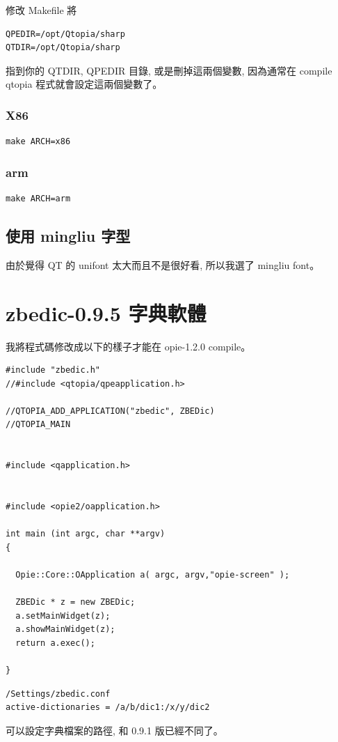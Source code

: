 \documentclass[12pt,a4paper]{article}
\begin{document}
\begin{CJK}{UTF8}{cwmu}
修改 Makefile 將
\begin{verbatim}
QPEDIR=/opt/Qtopia/sharp
QTDIR=/opt/Qtopia/sharp
\end{verbatim}
指到你的 QTDIR, QPEDIR 目錄, 或是刪掉這兩個變數,
因為通常在 compile qtopia 程式就會設定這兩個變數了。


\subsubsection{X86}
\begin{verbatim}
make ARCH=x86
\end{verbatim}
\subsubsection{arm}
\begin{verbatim}
make ARCH=arm
\end{verbatim}

\subsection{使用 mingliu 字型}
由於覺得 QT 的 unifont 太大而且不是很好看, 所以我選了 mingliu font。


\section{zbedic-0.9.5 字典軟體}

我將程式碼修改成以下的樣子才能在 opie-1.2.0 compile。
\begin{verbatim}
#include "zbedic.h"
//#include <qtopia/qpeapplication.h>

//QTOPIA_ADD_APPLICATION("zbedic", ZBEDic)
//QTOPIA_MAIN


#include <qapplication.h>


#include <opie2/oapplication.h>

int main (int argc, char **argv)
{

  Opie::Core::OApplication a( argc, argv,"opie-screen" );

  ZBEDic * z = new ZBEDic;
  a.setMainWidget(z);
  a.showMainWidget(z);
  return a.exec();

}
\end{verbatim}

\begin{verbatim}
/Settings/zbedic.conf
active-dictionaries = /a/b/dic1:/x/y/dic2
\end{verbatim}
可以設定字典檔案的路徑, 和 0.9.1 版已經不同了。


\end{CJK}
\end{document}
